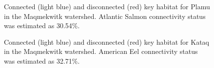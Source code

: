 \documentclass[
  letterpaper,
  DIV=11,
  numbers=noendperiod]{scrreprt}
\begin{document}
\begin{figure}


\caption{\label{fig-4}Connected (light blue) and disconnected (red) key
habitat for Plamu in the Maqmekwitk watershed. Atlantic Salmon
connectivity status was estimated as 30.54\%.}

\end{figure}%

\begin{figure}


\caption{\label{fig-5}Connected (light blue) and disconnected (red) key
habitat for Kataq in the Maqmekwitk watershed. American Eel connectivity
status was estimated as 32.71\%.}

\end{figure}%
\end{document}
